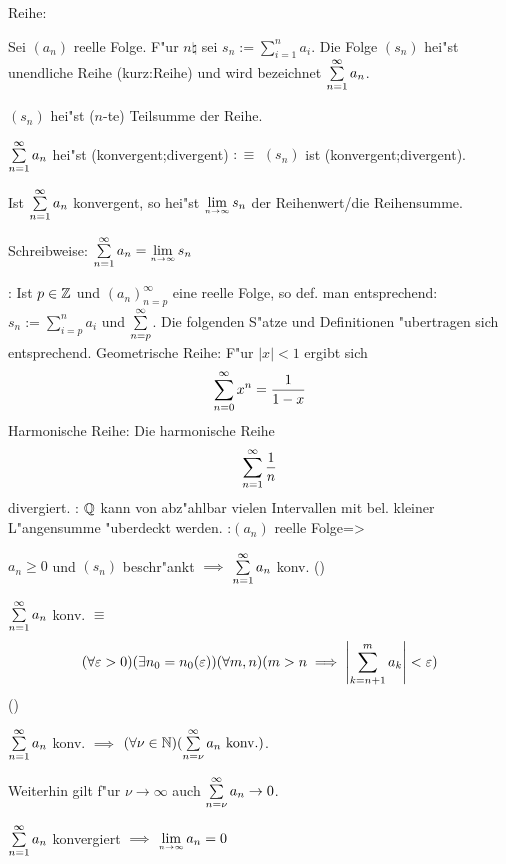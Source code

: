  Reihe:{
  Sei $(a_n)$ reelle Folge. F"ur $n\natural$ sei
  $s_n:=\sum_{i=1}^n a_i$. Die Folge $(s_n)$ hei"st unendliche Reihe
  (kurz:Reihe) und wird bezeichnet $\sumn 1 a_n$.
  
  $(s_n)$ hei"st ($n$-te) Teilsumme der Reihe.
  
  $\sumn 1 a_n$ hei"st \tstack(konvergent;divergent) $:\equiv$
  $(s_n)$ ist \tstack(konvergent;divergent).
  
  Ist $\sumn 1 a_n$ konvergent, so hei"st $\limn s_n$ der
  Reihenwert/die Reihensumme.
  
  Schreibweise: $\sumn 1 a_n = \limn s_n$
  }
\remark:{
  Ist $p\in\mathbb Z$ und $(a_n)_{n=p}^\infty$ eine reelle Folge, so def.
  man entsprechend: $s_n:=\sum_{i=p}^n a_i$ und $\sumn p$. Die folgenden
  S"atze und Definitionen "ubertragen sich entsprechend.
  }
\example Geometrische Reihe:{
  F"ur $|x|<1$ ergibt sich
  \[\sumn 0 x^n=\frac 1 {1-x}
    \]
  }
\example Harmonische Reihe:{
  Die harmonische Reihe
  \[\sumn 1 \frac 1 n
    \]
  divergiert.
  }
\remark:{
  $\mathbb Q$ kann von abz"ahlbar vielen Intervallen mit bel. kleiner L"angensumme
  "uberdeckt werden.
  }
\theorem:$(a_n)$ reelle Folge=>{
  \begin{stmts}
    \item $a_n\ge 0$ und $(s_n)$ beschr"ankt $\implies$ $\sumn 1 a_n$ konv.
      (\emph{})
    \item $\sumn 1 a_n$ konv. $\equiv$
      \[\epsn(\exists n_0=n_0(\epsilon))(\forall m,n)
        (m > n\implies\left|\sum_{k=n+1}^m a_k\right|<\epsilon)
	\]
      (\emph{})
    \item $\sumn 1 a_n$ konv. $\implies$ $(\forall \nu\natural)(\sumn \nu a_n \text{ konv.})$. 
    
      Weiterhin gilt f"ur $\nu\to\infty$ auch $\sumn\nu a_n\to 0$.
    \item $\sumn 1 a_n$ konvergiert $\implies$ $\limn a_n=0$ 
    \end{stmts}
  }
